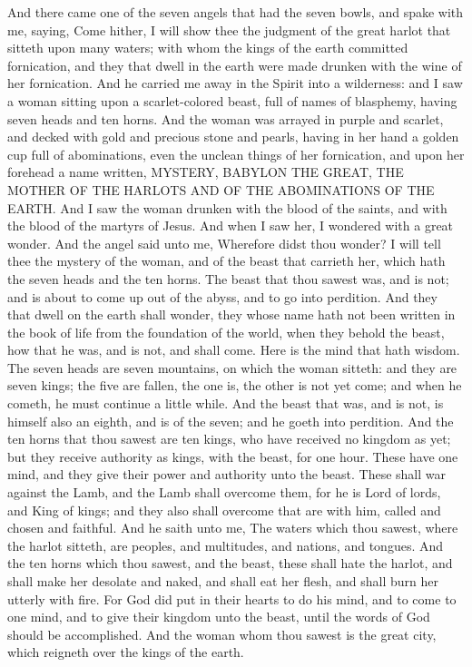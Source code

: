 And there came one of the seven angels that had the seven bowls, and spake with me, saying, Come hither, I will show thee the judgment of the great harlot that sitteth upon many waters; with whom the kings of the earth committed fornication, and they that dwell in the earth were made drunken with the wine of her fornication. And he carried me away in the Spirit into a wilderness: and I saw a woman sitting upon a scarlet-colored beast, full of names of blasphemy, having seven heads and ten horns. And the woman was arrayed in purple and scarlet, and decked with gold and precious stone and pearls, having in her hand a golden cup full of abominations, even the unclean things of her fornication, and upon her forehead a name written, MYSTERY, BABYLON THE GREAT, THE MOTHER OF THE HARLOTS AND OF THE ABOMINATIONS OF THE EARTH. And I saw the woman drunken with the blood of the saints, and with the blood of the martyrs of Jesus. And when I saw her, I wondered with a great wonder. And the angel said unto me, Wherefore didst thou wonder? I will tell thee the mystery of the woman, and of the beast that carrieth her, which hath the seven heads and the ten horns. The beast that thou sawest was, and is not; and is about to come up out of the abyss, and to go into perdition. And they that dwell on the earth shall wonder, they whose name hath not been written in the book of life from the foundation of the world, when they behold the beast, how that he was, and is not, and shall come. Here is the mind that hath wisdom. The seven heads are seven mountains, on which the woman sitteth: and they are seven kings; the five are fallen, the one is, the other is not yet come; and when he cometh, he must continue a little while. And the beast that was, and is not, is himself also an eighth, and is of the seven; and he goeth into perdition. And the ten horns that thou sawest are ten kings, who have received no kingdom as yet; but they receive authority as kings, with the beast, for one hour. These have one mind, and they give their power and authority unto the beast. These shall war against the Lamb, and the Lamb shall overcome them, for he is Lord of lords, and King of kings; and they also shall overcome that are with him, called and chosen and faithful. And he saith unto me, The waters which thou sawest, where the harlot sitteth, are peoples, and multitudes, and nations, and tongues. And the ten horns which thou sawest, and the beast, these shall hate the harlot, and shall make her desolate and naked, and shall eat her flesh, and shall burn her utterly with fire. For God did put in their hearts to do his mind, and to come to one mind, and to give their kingdom unto the beast, until the words of God should be accomplished. And the woman whom thou sawest is the great city, which reigneth over the kings of the earth. 

